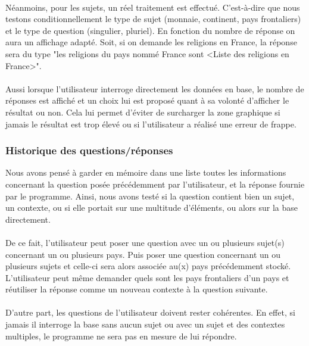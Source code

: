 \documentclass[11pt,a4paper]{article}
\begin{document}
\paragraph{}Néanmoins, pour les sujets, un réel traitement est effectué. C'est-à-dire que nous testons conditionnellement le type de sujet (monnaie, continent, pays frontaliers) et le type de question (singulier, pluriel). En fonction du nombre de réponse on aura un affichage adapté. Soit, si on demande les religions en France, la réponse sera du type "les religions du pays nommé France sont <Liste des religions en France>". 
\paragraph{}Aussi lorsque l'utilisateur interroge directement les données en base, le nombre de réponses est affiché et un choix lui est proposé quant à sa volonté d'afficher le résultat ou non. Cela lui permet d'éviter de surcharger la zone graphique si jamais le résultat est trop élevé ou si l'utilisateur a réalisé une erreur de frappe.

\subsubsection{Historique des questions/réponses}
Nous avons pensé à garder en mémoire dans une liste toutes les informations concernant la question posée précédemment par l'utilisateur, et la réponse fournie par le programme. Ainsi, nous avons testé si la question contient bien un sujet, un contexte, ou si elle portait sur une multitude d'éléments, ou alors sur la base directement. 
\paragraph{}De ce fait, l'utilisateur peut poser une question avec un ou plusieurs sujet(s) concernant un ou plusieurs pays. Puis poser une question concernant un ou plusieurs sujets et celle-ci sera alors associée au(x) pays précédemment stocké. L'utilisateur peut même demander quels sont les pays frontaliers d'un pays et réutiliser la réponse comme un nouveau contexte à la question suivante.
\paragraph{}D'autre part, les questions de l'utilisateur doivent rester cohérentes. En effet, si jamais il interroge la base sans aucun sujet ou avec un sujet et des contextes multiples, le programme ne sera pas en mesure de lui répondre.
\end{document}
